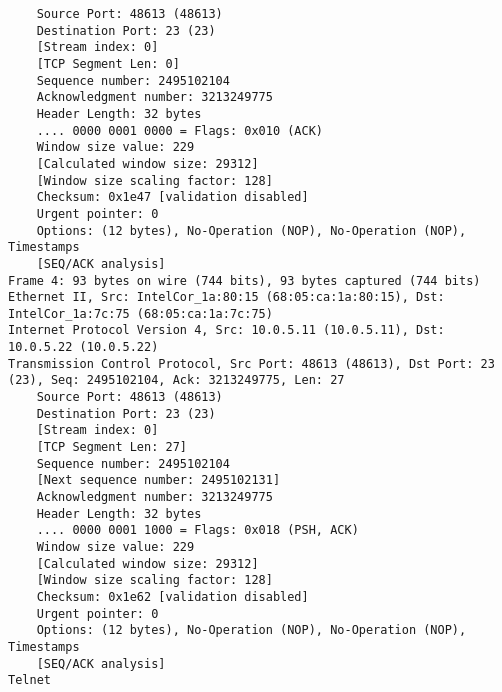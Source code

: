 \begin{lstlisting}
    Source Port: 48613 (48613)
    Destination Port: 23 (23)
    [Stream index: 0]
    [TCP Segment Len: 0]
    Sequence number: 2495102104
    Acknowledgment number: 3213249775
    Header Length: 32 bytes
    .... 0000 0001 0000 = Flags: 0x010 (ACK)
    Window size value: 229
    [Calculated window size: 29312]
    [Window size scaling factor: 128]
    Checksum: 0x1e47 [validation disabled]
    Urgent pointer: 0
    Options: (12 bytes), No-Operation (NOP), No-Operation (NOP), Timestamps
    [SEQ/ACK analysis]
Frame 4: 93 bytes on wire (744 bits), 93 bytes captured (744 bits)
Ethernet II, Src: IntelCor_1a:80:15 (68:05:ca:1a:80:15), Dst: IntelCor_1a:7c:75 (68:05:ca:1a:7c:75)
Internet Protocol Version 4, Src: 10.0.5.11 (10.0.5.11), Dst: 10.0.5.22 (10.0.5.22)
Transmission Control Protocol, Src Port: 48613 (48613), Dst Port: 23 (23), Seq: 2495102104, Ack: 3213249775, Len: 27
    Source Port: 48613 (48613)
    Destination Port: 23 (23)
    [Stream index: 0]
    [TCP Segment Len: 27]
    Sequence number: 2495102104
    [Next sequence number: 2495102131]
    Acknowledgment number: 3213249775
    Header Length: 32 bytes
    .... 0000 0001 1000 = Flags: 0x018 (PSH, ACK)
    Window size value: 229
    [Calculated window size: 29312]
    [Window size scaling factor: 128]
    Checksum: 0x1e62 [validation disabled]
    Urgent pointer: 0
    Options: (12 bytes), No-Operation (NOP), No-Operation (NOP), Timestamps
    [SEQ/ACK analysis]
Telnet
\end{lstlisting}

